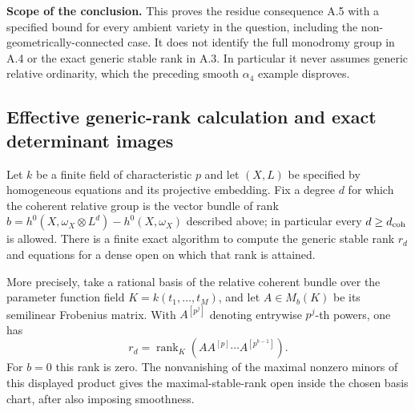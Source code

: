 \par\smallskip\noindent\textbf{Scope of the conclusion.}
This proves the residue consequence A.5 with a specified
bound for every ambient variety in the question, including
the non-geometrically-connected case.  It does not identify
the full monodromy group in A.4 or the exact generic stable
rank in A.3.  In particular it never assumes generic
relative ordinarity, which the preceding smooth
$\alpha_4$ example disproves.



\subsection{Effective generic-rank calculation and exact determinant images}
\label{subsec:effective-rank-determinant}

\begin{proposition}\label{prop:effective-generic-rank}
Let $k$ be a finite field of characteristic $p$ and let
$(X,L)$ be specified by homogeneous equations and its
projective embedding.  Fix a degree $d$ for which the
coherent relative group is the vector bundle of rank
$b=h^0(X,\omega_X\otimes L^d)-h^0(X,\omega_X)$ described
above; in particular every $d\geq d_{\rm coh}$ is allowed.
There is a finite exact algorithm to compute the generic
stable rank $r_d$ and equations for a dense open on
which that rank is attained.

More precisely, take a rational basis of the relative
coherent bundle over the parameter function field
$K=k(t_1,\ldots,t_M)$, and let $A\in M_b(K)$ be its
semilinear Frobenius matrix.  With $A^{[p^j]}$ denoting
entrywise $p^j$-th powers, one has
\begin{equation}\label{eq:generic-rank-finite-product}
 r_d=\operatorname{rank}_K
       \left(A A^{[p]}\cdots A^{[p^{b-1}]}\right).
\end{equation}
For $b=0$ this rank is zero.  The nonvanishing of the
maximal nonzero minors of this displayed product gives
the maximal-stable-rank open inside the chosen basis
chart, after also imposing smoothness.
\end{proposition}

